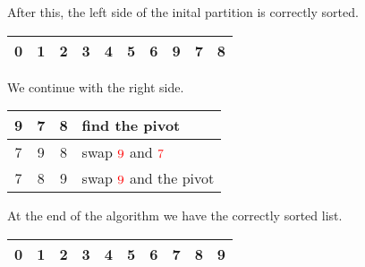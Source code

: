 After this, the left side of the inital partition is correctly sorted.

\begin{center}
    \begin{tabular}{ | c | c | c | c | c | c || c || c | c | c | }
        \hline
        0 & 1 & 2 & 3 & 4 & 5 & \cellcolor{LightCyan}6 & 9 & 7 & 8 \\ \hline
    \end{tabular}
\end{center}

We continue with the right side.

\begin{center}
    \begin{tabular}{ | c | c | c | l |}
        \hline
        9 & 7 & \cellcolor{LightCyan}8 & find the {\color{cyan}pivot} \\ \hline
        \color{red}7 & \color{red}9 & \cellcolor{LightCyan}8 & swap \(\color{red}9\) and \(\color{red}7\) \\ \hline
        7 & \color{cyan}8 & \color{red}9 & swap \(\color{red}9\) and the {\color{cyan}pivot} \\ \hline
    \end{tabular}
\end{center}

At the end of the algorithm we have the correctly sorted list.

\begin{center}
    \begin{tabular}{ | c | c | c | c | c | c | c | c | c | c | }
        \hline
        0 & 1 & 2 & 3 & 4 & 5 & 6 & 7 & 8 & 9 \\ \hline
    \end{tabular}
\end{center}